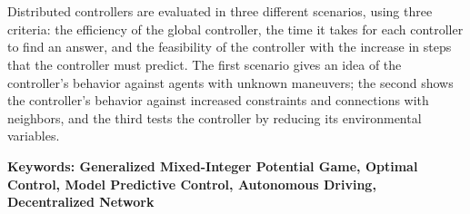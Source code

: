 \\
\\
Distributed controllers are evaluated in three different scenarios, using three criteria: the efficiency of the global controller, the time it takes for each controller to find an answer, and the feasibility of the controller with the increase in steps that the controller must predict. The first scenario gives an idea of the controller's behavior against agents with unknown maneuvers; the second shows the controller's behavior against increased constraints and connections with neighbors, and the third tests the controller by reducing its environmental variables.

\vspace{0.7cm}
\textbf{\small Keywords: Generalized Mixed-Integer Potential Game, Optimal Control, Model Predictive Control, Autonomous Driving, Decentralized Network}
\vspace{1.5cm}